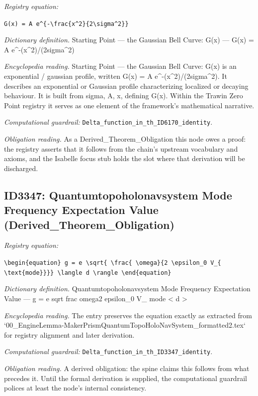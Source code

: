 \documentclass[11pt]{article}
\theoremstyle{remark}
\begin{document}
\noindent\textit{Registry equation:}\par
{\small\texttt{G(x) = A e\textasciicircum{}\{-\textbackslash{}frac\{x\textasciicircum{}2\}\{2\textbackslash{}sigma\textasciicircum{}2\}\}}}\par\medskip
\noindent\textit{Dictionary definition.} Starting Point --- the Gaussian Bell Curve: G(x) --- G(x) = A e\textasciicircum{}-(x\textasciicircum{}2)/(2sigma\textasciicircum{}2)\par\medskip
\noindent\textit{Encyclopedia reading.} Starting Point --- the Gaussian Bell Curve: G(x) is an exponential / gaussian profile, written G(x) = A e\textasciicircum{}-(x\textasciicircum{}2)/(2sigma\textasciicircum{}2). It describes an exponential or Gaussian profile characterizing localized or decaying behaviour. It is built from sigma, A, x, defining G(x). Within the Trawin Zero Point registry it serves as one element of the framework's mathematical narrative.
\par\medskip\noindent\textit{Computational guardrail:} \texttt{Delta\_function\_in\_th\_ID6170\_identity}.
\par\medskip\noindent\textit{Obligation reading.} As a Derived\_Theorem\_Obligation this node owes a proof: the registry asserts that it follows from the chain's upstream vocabulary and axioms, and the Isabelle focus stub holds the slot where that derivation will be discharged.

\subsection{ID3347: Quantumtopoholonavsystem Mode Frequency Expectation Value (Derived\_Theorem\_Obligation)}

\noindent\textit{Registry equation:}\par
{\small\texttt{\textbackslash{}begin\{equation\} g = e \textbackslash{}sqrt\{ \textbackslash{}frac\{ \textbackslash{}omega\}\{2 \textbackslash{}epsilon\_0 V\_\{ \textbackslash{}text\{mode\}\}\}\} \textbackslash{}langle d \textbackslash{}rangle \textbackslash{}end\{equation\}}}\par\medskip
\noindent\textit{Dictionary definition.} Quantumtopoholonavsystem Mode Frequency Expectation Value --- g = e sqrt frac omega2 epsilon\_0 V\_ mode < d >\par\medskip
\noindent\textit{Encyclopedia reading.} The entry preserves the equation exactly as extracted from `00\_EngineLemma-MakerPrismQuantumTopoHoloNavSystem\_formatted2.tex` for registry alignment and later derivation.
\par\medskip\noindent\textit{Computational guardrail:} \texttt{Delta\_function\_in\_th\_ID3347\_identity}.
\par\medskip\noindent\textit{Obligation reading.} A derived obligation: the spine claims this follows from what precedes it. Until the formal derivation is supplied, the computational guardrail polices at least the node's internal consistency.
\end{document}
